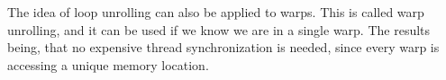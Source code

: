 The idea of loop unrolling can also be applied to warps. This is called warp unrolling, and it can be used if we know we are in a single warp. The results being, that no expensive thread synchronization is needed, since every warp is accessing a unique memory location.



\cleardoublepage

